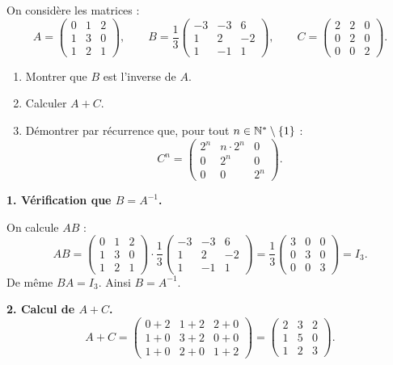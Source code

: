 On considère les matrices :
\[
A = \begin{pmatrix}0&1&2\\1&3&0\\1&2&1\end{pmatrix}, \qquad
B = \frac{1}{3}\begin{pmatrix}-3&-3&6\\1&2&-2\\1&-1&1\end{pmatrix}, \qquad
C = \begin{pmatrix}2&2&0\\0&2&0\\0&0&2\end{pmatrix}.
\]
\begin{enumerate}
	\item Montrer que $B$ est l'inverse de $A$.
	\item Calculer $A+C$.
	\item Démontrer par récurrence que, pour tout $n\in\mathbb{N}^*\setminus\{1\}$ :
	\[
	C^n = \begin{pmatrix}2^n & n\cdot 2^n & 0\\0&2^n&0\\0&0&2^n\end{pmatrix}.
	\]
\end{enumerate}

\solution

\textbf{1. Vérification que $B = A^{-1}$.}

On calcule $AB$ :
\[
AB = \begin{pmatrix}0&1&2\\1&3&0\\1&2&1\end{pmatrix}
\cdot\frac{1}{3}\begin{pmatrix}-3&-3&6\\1&2&-2\\1&-1&1\end{pmatrix}
= \frac{1}{3}\begin{pmatrix}3&0&0\\0&3&0\\0&0&3\end{pmatrix} = I_3.
\]
De même $BA=I_3$. Ainsi $B = A^{-1}$.

\textbf{2. Calcul de $A+C$.}
\[
A+C = \begin{pmatrix}0+2&1+2&2+0\\1+0&3+2&0+0\\1+0&2+0&1+2\end{pmatrix}
= \begin{pmatrix}2&3&2\\1&5&0\\1&2&3\end{pmatrix}.
\]

